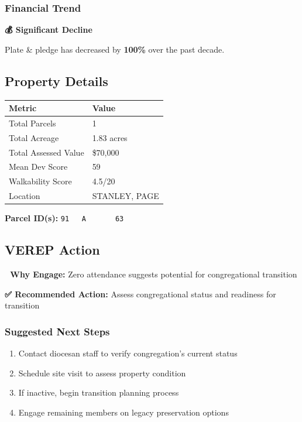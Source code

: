 \documentclass[
  letterpaper,
  DIV=11,
  numbers=noendperiod,
  oneside]{scrreprt}
\providecommand{\tightlist}{%
  \setlength{\itemsep}{0pt}\setlength{\parskip}{0pt}}
\begin{document}
\subsubsection{Financial Trend}\label{financial-trend-4}

\textbf{💰 Significant Decline}

Plate \& pledge has decreased by \textbf{100\%} over the past decade.

\subsection{Property Details}

\begin{longtable}[]{@{}ll@{}}
\toprule\noalign{}
Metric & Value \\
\midrule\noalign{}
\endhead
\bottomrule\noalign{}
\endlastfoot
Total Parcels & 1 \\
Total Acreage & 1.83 acres \\
Total Assessed Value & \$70,000 \\
Mean Dev Score & 59 \\
Walkability Score & 4.5/20 \\
Location & STANLEY, PAGE \\
\end{longtable}

\textbf{Parcel ID(s):} \texttt{91\ \ \ A\ \ \ \ \ \ \ 63}

\subsection{VEREP Action}

\textbf{🎯 Why Engage:} Zero attendance suggests potential for
congregational transition

\textbf{✅ Recommended Action:} Assess congregational status and
readiness for transition

\subsubsection{Suggested Next Steps}\label{suggested-next-steps-4}

\begin{enumerate}
\def\labelenumi{\arabic{enumi}.}
\tightlist
\item
  Contact diocesan staff to verify congregation's current status
\item
  Schedule site visit to assess property condition
\item
  If inactive, begin transition planning process
\item
  Engage remaining members on legacy preservation options
\end{enumerate}
\end{document}

